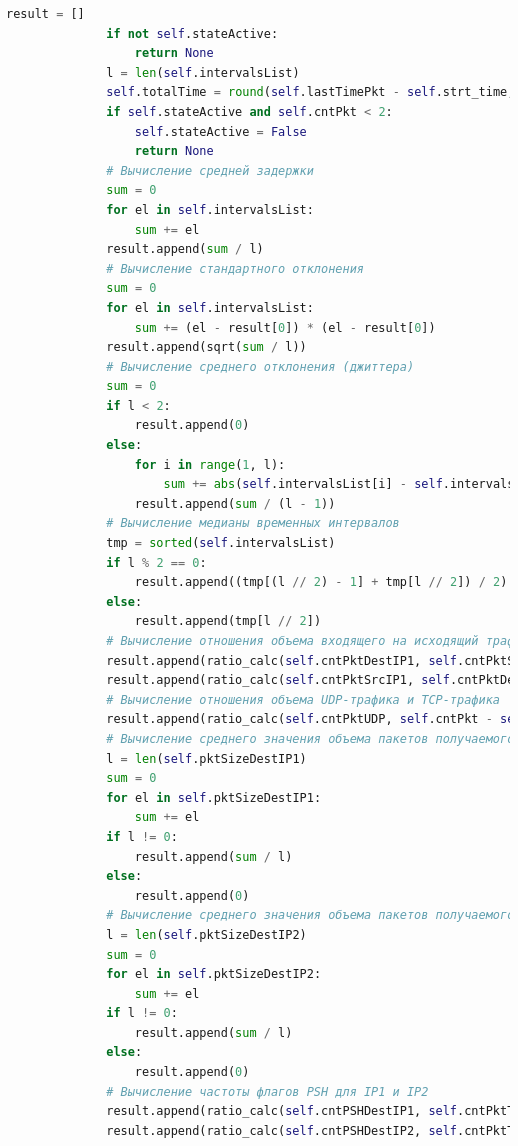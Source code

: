 \documentclass[bachelor, och, coursework]{SCWorks}
\begin{document}
\begin{lstlisting}[language=Python]
              result = []
              if not self.stateActive:
                  return None
              l = len(self.intervalsList)
              self.totalTime = round(self.lastTimePkt - self.strt_time, 2)
              if self.stateActive and self.cntPkt < 2:
                  self.stateActive = False
                  return None
              # Вычисление средней задержки
              sum = 0
              for el in self.intervalsList:
                  sum += el
              result.append(sum / l)
              # Вычисление стандартного отклонения
              sum = 0
              for el in self.intervalsList:
                  sum += (el - result[0]) * (el - result[0])
              result.append(sqrt(sum / l))
              # Вычисление среднего отклонения (джиттера)
              sum = 0
              if l < 2:
                  result.append(0)
              else:
                  for i in range(1, l):
                      sum += abs(self.intervalsList[i] - self.intervalsList[i - 1])
                  result.append(sum / (l - 1))
              # Вычисление медианы временных интервалов
              tmp = sorted(self.intervalsList)
              if l % 2 == 0:
                  result.append((tmp[(l // 2) - 1] + tmp[l // 2]) / 2)
              else:
                  result.append(tmp[l // 2])
              # Вычисление отношения объема входящего на исходящий трафик для IP1 и IP2
              result.append(ratio_calc(self.cntPktDestIP1, self.cntPktSrcIP1))
              result.append(ratio_calc(self.cntPktSrcIP1, self.cntPktDestIP1))
              # Вычисление отношения объема UDP-трафика и TCP-трафика
              result.append(ratio_calc(self.cntPktUDP, self.cntPkt - self.cntPktUDP))
              # Вычисление среднего значения объема пакетов получаемого IP1
              l = len(self.pktSizeDestIP1)
              sum = 0
              for el in self.pktSizeDestIP1:
                  sum += el
              if l != 0:
                  result.append(sum / l)
              else:
                  result.append(0)
              # Вычисление среднего значения объема пакетов получаемого IP2
              l = len(self.pktSizeDestIP2)
              sum = 0
              for el in self.pktSizeDestIP2:
                  sum += el
              if l != 0:
                  result.append(sum / l)
              else:
                  result.append(0)
              # Вычисление частоты флагов PSH для IP1 и IP2
              result.append(ratio_calc(self.cntPSHDestIP1, self.cntPktTCPDestIP1))
              result.append(ratio_calc(self.cntPSHDestIP2, self.cntPktTCPDestIP2))

\end{lstlisting}
\end{document}
